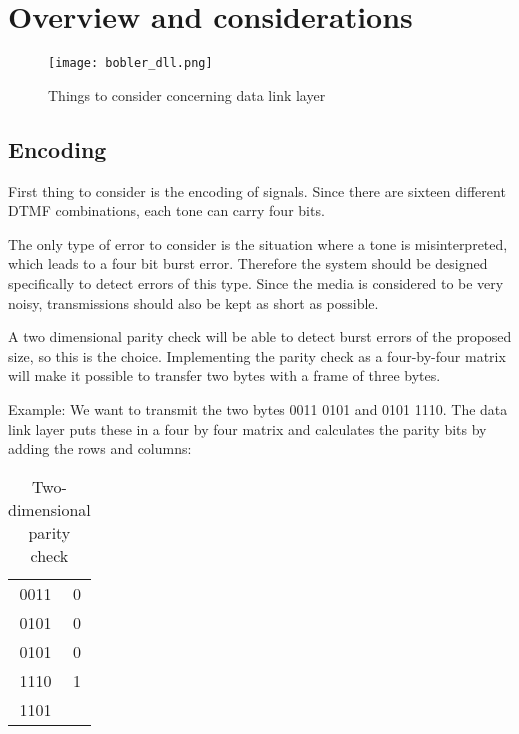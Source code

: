 \section{Overview and considerations}%

\begin{figure}[htb]
	\begin{center}
	\texttt{[image: bobler\_dll.png]} %
	\caption{Things to consider concerning data link layer}
	\label{fig:bobler_dll}
	\end{center}
\end{figure}

\subsection{Encoding}
First thing to consider is the encoding of signals. Since there are sixteen
different DTMF combinations, each tone can carry four bits.

The only type of error to consider is the situation where a tone is
misinterpreted, which leads to a four bit burst error. Therefore the system
should be designed specifically to detect errors of this type. Since the media
is considered to be very noisy, transmissions should also be kept as short as
possible.

A two dimensional parity check will be able to detect burst errors of the
proposed size, so this is the choice. Implementing the parity check as a
four-by-four matrix will make it possible to transfer two bytes with a frame of
three bytes.

Example: We want to transmit the two bytes 0011 0101 and 0101 1110. The data
link layer puts these in a four by four matrix and calculates the parity bits by
adding the rows and columns:

\begin{table}[htb]
	\begin{center}
	\begin{tabular}{c|c}
	0011 & 0 \\
	0101 & 0 \\
	0101 & 0 \\
	1110 & 1 \\
	\hline
	1101 & \\
	\end{tabular}
	\end{center}
	\caption{Two-dimensional parity check}
	\label{tab:Two_dimensional_parity_check}
\end{table}

